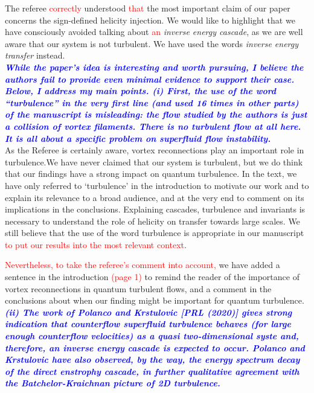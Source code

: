 \documentclass[a4paper,10pt]{article}
\def\red#1{\textcolor{red}{#1}}
\def\blue#1{\textcolor{blue}{#1}}
\def\refcomment#1{\textbf{\blue{\emph{#1}}}\\}
\begin{document}
The referee \red{correctly} understood \red{that}
the most important claim of our paper concerns the sign-defined helicity 
injection. We would like to highlight that we have consciously avoided 
talking about \red{an} {\it inverse energy cascade}, as we are well aware 
that our system is not turbulent. We have used the words {\it inverse energy transfer} instead.\\

\refcomment{While the paper’s idea is interesting and worth pursuing, I believe the authors fail to provide even minimal evidence to support their case. Below, I address my main points.
(i) First, the use of the word “turbulence” in the very first line (and used 16 times in other parts) of the manuscript is misleading: the flow studied by the authors is just a collision of vortex filaments. There is no turbulent flow at all here. It is all about a specific problem on superfluid flow instability.}

As the Referee is certainly aware, vortex reconnections play an important role in turbulence.We have never claimed that our system is turbulent, but we do think that our findings have a strong impact on quantum turbulence. In the text, we have only referred to `turbulence' in the introduction to motivate our work and to explain its relevance to a broad audience, and at the very end to comment on its implications in the conclusions. Explaining cascades, turbulence and invariants is necessary to understand the role of helicity on transfer towards large scales. We still believe that the use of the word turbulence is 
appropriate in our manuscript \red{to put our results into the most 
relevant context}. 

\red{Nevertheless, to take the referee's comment into account,}
we have added a sentence in the introduction \red{(page 1)}
to remind the reader of the importance of vortex reconnections 
in quantum turbulent flows, and a comment in the conclusions 
about when our finding might be important for quantum turbulence. \\

\refcomment{(ii) The work of Polanco and Krstulovic [PRL (2020)] gives strong indication that counterflow superfluid turbulence behaves (for large enough counterflow velocities) as a quasi two-dimensional syste and, therefore, an inverse energy cascade is expected to occur. Polanco and Krstulovic have also observed, by the way, the energy spectrum decay of the direct enstrophy cascade, in further qualitative agreement with the Batchelor-Kraichnan picture of 2D turbulence.}
\end{document}
